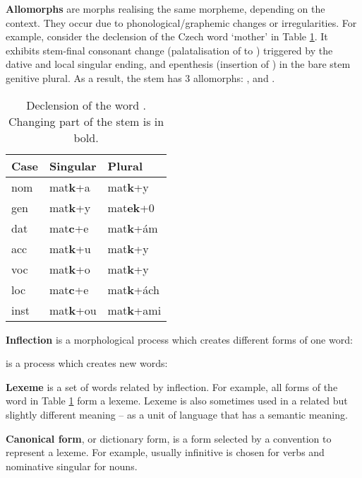 \textbf{Allomorphs} are morphs realising the same morpheme, depending on the context. They occur due to phonological/graphemic changes or irregularities. For example, consider the declension of the Czech word  `mother' in Table \ref{table:matka}. It exhibits stem-final conso\-nant chan\-ge (palatalisation of  to ) triggered by the dative and local singular ending, and epenthesis (insertion of ) in the bare stem genitive plural. As a result, the stem has 3 allomorphs: ,  and .
\begin{table}[htb]
\begin{center}
\begin{tabular}{lll}
\toprule \bf Case & \bf Singular & \bf Plural \\ \midrule
nom & mat\textbf{k}+a & mat\textbf{k}+y \\
gen & mat\textbf{k}+y & mat\textbf{ek}+0 \\
dat & mat\textbf{c}+e & mat\textbf{k}+ám\\
acc & mat\textbf{k}+u & mat\textbf{k}+y \\
voc & mat\textbf{k}+o & mat\textbf{k}+y \\
loc & mat\textbf{c}+e & mat\textbf{k}+ách \\
inst & mat\textbf{k}+ou & mat\textbf{k}+ami \\
\bottomrule
\end{tabular}
\end{center}
\caption{\label{table:matka} Declension of the word . Changing part of the stem is in bold.}
\end{table}

\noindent \textbf{Inflection} is a morphological process which creates different forms of one word:
\begin{quote}
\end{quote}  is a process which creates new words: \begin{quote}
\end{quote} 

\noindent \textbf{Lexeme} is a set of words related by inflection. For example, all forms of the word  in Table \ref{table:matka} form a lexeme. Lexeme is also sometimes used in a related but slightly different meaning -- as a unit of language that has a semantic meaning.

\textbf{Canonical form}, or dictionary form, is a form selected by a convention to represent a lexeme. For example, usually infinitive is chosen for verbs and nominative singular for nouns.

